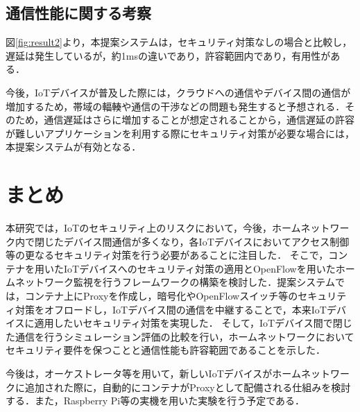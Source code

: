 \documentclass[Japanese]{dicomopapers}
\begin{document}
\subsection{通信性能に関する考察}
図\ref{fig:result2}より，本提案システムは，セキュリティ対策なしの場合と比較し，遅延は発生しているが，約1msの違いであり，許容範囲内であり，有用性がある．\par
今後，IoTデバイスが普及した際には，クラウドへの通信やデバイス間の通信が増加するため，帯域の輻輳や通信の干渉などの問題も発生すると予想される．そのため，通信遅延はさらに増加することが想定されることから，通信遅延の許容が難しいアプリケーションを利用する際にセキュリティ対策が必要な場合には，本提案システムが有効となる．

\section{まとめ}
本研究では，IoTのセキュリティ上のリスクにおいて，今後，ホームネットワーク内で閉じたデバイス間通信が多くなり，各IoTデバイスにおいてアクセス制御等の更なるセキュリティ対策を行う必要があることに注目した．
そこで，コンテナを用いたIoTデバイスへのセキュリティ対策の適用とOpenFlowを用いたホームネットワーク監視を行うフレームワークの構築を検討した．提案システムでは，コンテナ上にProxyを作成し，暗号化やOpenFlowスイッチ等のセキュリティ対策をオフロードし，IoTデバイス間の通信を中継することで，本来IoTデバイスに適用したいセキュリティ対策を実現した．
そして，IoTデバイス間で閉じた通信を行うシミュレーション評価の比較を行い，ホームネットワークにおいてセキュリティ要件を保つことと通信性能も許容範囲であることを示した．\par
今後は，オーケストレータ等を用いて，新しいIoTデバイスがホームネットワークに追加された際に，自動的にコンテナがProxyとして配備される仕組みを検討する．また，Raspberry Pi等の実機を用いた実験を行う予定である．
\end{document}
